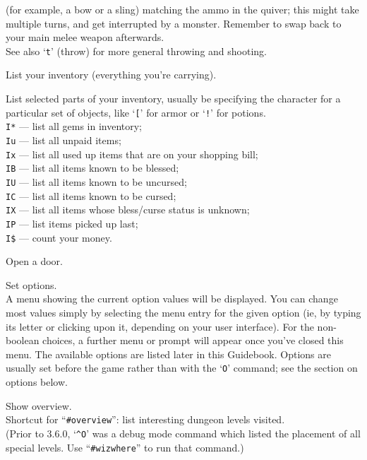 (for example, a bow or a sling) matching the ammo in the quiver; this might
take multiple turns, and get interrupted by a monster.
Remember to swap back to your main melee weapon afterwards.
\\
See also `{\tt t}' (throw) for more general throwing and shooting.
\item[\tb{i}]
List your inventory (everything you're carrying).
\item[\tb{I}]
List selected parts of your inventory, usually be specifying the character
for a particular set of objects, like `{\tt [}' for armor or `{\tt !}'
for potions.\\
{\tt I*} --- list all gems in inventory;\\
{\tt Iu} --- list all unpaid items;\\
{\tt Ix} --- list all used up items that are on your shopping bill;\\
{\tt IB} --- list all items known to be blessed;\\
{\tt IU} --- list all items known to be uncursed;\\
{\tt IC} --- list all items known to be cursed;\\
{\tt IX} --- list all items whose bless/curse status is unknown;\\
{\tt IP} --- list items picked up last;\\
{\tt I\$} --- count your money.
\item[\tb{o}]
Open a door.
\item[\tb{O}]
Set options.\\
A menu showing the current option values will be
displayed.  You can change most values simply by selecting the menu
entry for the given option (ie, by typing its letter or clicking upon
it, depending on your user interface).  For the non-boolean choices,
a further menu or prompt will appear once you've closed this menu.
The available options
are listed later in this Guidebook.  Options are usually set before the
game rather than with the `{\tt O}' command; see the section on options below.
\item[\tb{\^{}O}]
Show overview.\\
Shortcut for ``{\tt \#overview}'':
list interesting dungeon levels visited.\\
(Prior to 3.6.0, `{\tt \^{}O}' was a debug mode command which listed
the placement of all special levels.
Use ``{\tt \#wizwhere}'' to run that command.)
\item[\tb{p}]
